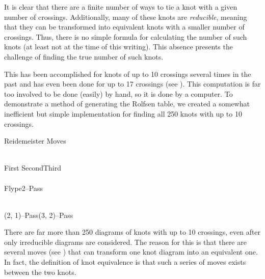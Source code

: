 \begin{paper}

It is clear that there are a finite number of ways to tie a knot with a given
number of crossings.
Additionally, many of these knots are \textit{reducible}, meaning that they can
be transformed into equivalent knots with a smaller number of crossings.
Thus, there is no simple formula for calculating the number of such knots (at
least not at the time of this writing).
This absence presents the challenge of finding the true number of such knots.

This has been accomplished for knots of up to 10 crossings several times in the
past and has even been done for up to 17 crossings (see \cite{htw}).
This computation is far too involved to be done (easily) by hand, so it is done
by a computer.
To demonstrate a method of generating the Rolfsen table, we created a somewhat
inefficient but simple implementation for finding all 250 knots with up to 10
crossings.

\begin{center}Reidemeister Moves\end{center}
\vspace{-1em}
\\

\hspace{-2ex}First \hspace{0.26\columnwidth}Second\hfill Third\hspace{2ex}\\

\\

\hspace{2ex}Flype\hfill 2--Pass\hspace{6ex}

\\

(2, 1)--Pass\hfill(3, 2)--Pass\hspace{4ex}

\vspace{1em}

There are far more than 250 diagrams of knots with up to 10 crossings, even
after only irreducible diagrams are considered.
The reason for this is that there are several moves (see \figMoves) that can
transform one knot diagram into an equivalent one.
In fact, the definition of knot equivalence is that such a series of moves
exists between the two knots.\\


\end{paper}

